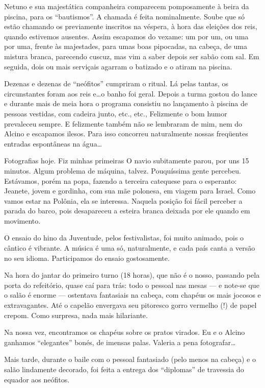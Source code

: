Netuno e sua majestática companheira comparecem pomposamente à beira da piscina, para os ``bautismos''. A chamada é feita nominalmente. Soube que só estão chamando os previamente inscritos na véspera, à hora das eleições dos reis, quando estivemos ausentes. Assim escapamos do vexame: um por um, ou uma por uma, frente às majestades, para umas boas pipocadas, na cabeça, de uma mistura branca, parecendo cuscuz, mas vim a saber depois ser sabão com sal. Em seguida, dois ou mais serviçais agarram o batizado e o atiram na piscina.

Dezenas e dezenas de ``neófitos'' cumpriram o ritual. Lá pelas tantas, os circunstantes foram aos reis e\ldots o banho foi geral. Depois a turma gostou do lance e durante mais de meia hora o programa consistiu no lançamento à piscina de pessoas vestidas, com cadeira junto, etc., etc., Felizmente o bom humor prevaleceu sempre. E felizmente também não se lembraram de mim, nem do Alcino e escapamos ilesos. Para isso concorreu naturalmente nossas freqüentes entradas espontâneas na água\ldots

Fotografias hoje. Fiz minhas primeiras O navio subitamente parou, por uns 15 minutos. Algum problema de máquina, talvez. Pouquíssima gente percebeu. Estávamos, porém na popa, fazendo a terceira catequese para o esperanto: Jeanete, jovem e gordinha, com sua mãe polonesa, em viagem para Israel. Como vamos estar na Polônia, ela se interessa. Naquela posição foi fácil perceber a parada do barco, pois desapareceu a esteira branca deixada por ele quando em movimento.

O ensaio do hino da Juventude, pelos festivalistas, foi muito animado, pois o cântico é vibrante. A música é uma só, naturalmente, e cada país canta a versão no seu idioma. Participamos do ensaio gostosamente.

Na hora do jantar do primeiro turno (18 horas), que não é o nosso, passando pela porta do refeitório, quase caí para trás: todo o pessoal nas mesas --- e note-se que o salão é enorme --- ostentava fantasiais na cabeça, com chapéus os mais jocosos e extravagantes. Até o capelão envergava seu pitoresco gorro vermelho (!) de papel crepom. Como surpresa, nada mais hilariante.

Na nossa vez, encontramos os chapéus sobre os pratos virados. Eu e o Alcino ganhamos ``elegantes'' bonés, de imensas palas. Valeria a pena fotografar\ldots

Mais tarde, durante o baile com o pessoal fantasiado (pelo menos na cabeça) e o salão lindamente decorado, foi feita a entrega dos ``diplomas'' de travessia do equador aos neófitos.

